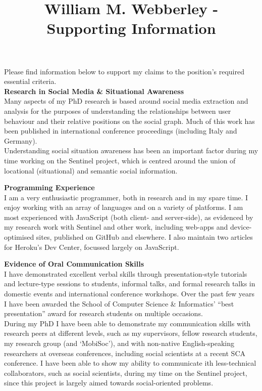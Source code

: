 \documentclass[11pt,a4paper]{article}
\title{William M. Webberley - Supporting Information}
\date{}
\begin{document}
\maketitle
Please find information below to support my claims to the position's required essential criteria.\\

\textbf{Research in Social Media \& Situational Awareness}\\
Many aspects of my PhD research is based around social media extraction and analysis for the purposes of understanding the relationships between user behaviour and their relative positions on the social graph. Much of this work has been published in international conference proceedings (including Italy and Germany).\\
Understanding social situation awareness has been an important factor during my time working on the Sentinel project, which is centred around the union of locational (situational) and semantic social information.

\textbf{Programming Experience}\\
I am a very enthusiastic programmer, both in research and in my spare time. I enjoy working with an array of languages and on a variety of platforms. I am most experienced with JavaScript (both client- and server-side), as evidenced by my research work with Sentinel and other work, including web-apps and device-optimised sites, published on GitHub and elsewhere. I also maintain two articles for Heroku's Dev Center, focussed largely on JavaScript.    

\textbf{Evidence of Oral Communication Skills}\\
I have demonstrated excellent verbal skills through presentation-style tutorials and lecture-type sessions to students, informal talks, and formal research talks in domestic events and international conference workshops. Over the past few years I have been awarded the School of Computer Science \& Informatics' ``best presentation'' award for research students on multiple occasions.\\
During my PhD I have been able to demonstrate my communication skills with research peers at different levels, such as my supervisors, fellow research students, my research group (and `MobiSoc'), and with non-native English-speaking researchers at overseas conferences, including social scientists at a recent SCA conference. I have been able to show my ability to communicate ith less-technical collaborators, such as social scientists, during my time on the Sentinel project, since this project is largely aimed towards social-oriented problems.
\end{document}
